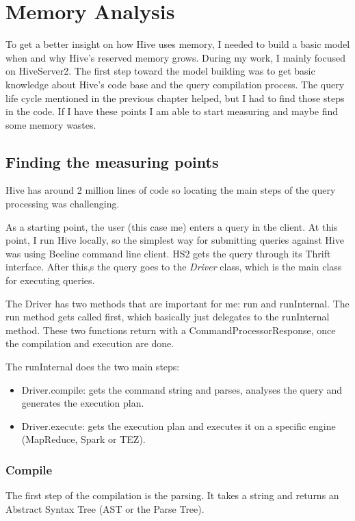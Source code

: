 \chapter{Memory Analysis}
To get a better insight on how Hive uses memory, I needed to build a basic model when and why Hive's reserved memory grows. During my work, I mainly focused on HiveServer2. The first step toward the model building was to get basic knowledge about Hive's code base and the query compilation process. The query life cycle mentioned in the previous chapter helped, but I had to find those steps in the code. If I have these points I am able to start measuring and maybe find some memory wastes.

\section{Finding the measuring points}
Hive has around 2 million lines of code so locating the main steps of the query processing was challenging. 

As a starting point, the user (this case me) enters a query in the client. At this point, I run Hive locally, so the simplest way for submitting queries against Hive was using Beeline command line client. HS2 gets the query through its Thrift interface. After this,s the query goes to the \textit{Driver} class, which is the main class for executing queries.

The Driver has two methods that are important for me: run and runInternal. The run method gets called first, which basically just delegates to the runInternal method. These two functions return with a CommandProcessorResponse, once the compilation and execution are done. 

\noindent The runInternal does the two main steps:
\begin{itemize}
	\item Driver.compile: gets the command string and parses, analyses the query and generates the execution plan.
	\item Driver.execute: gets the execution plan and executes it on a specific engine (MapReduce, Spark or TEZ).
\end{itemize}

\subsection{Compile}
The first step of the compilation is the parsing. It takes a string and returns an Abstract Syntax Tree (AST or the Parse Tree).

